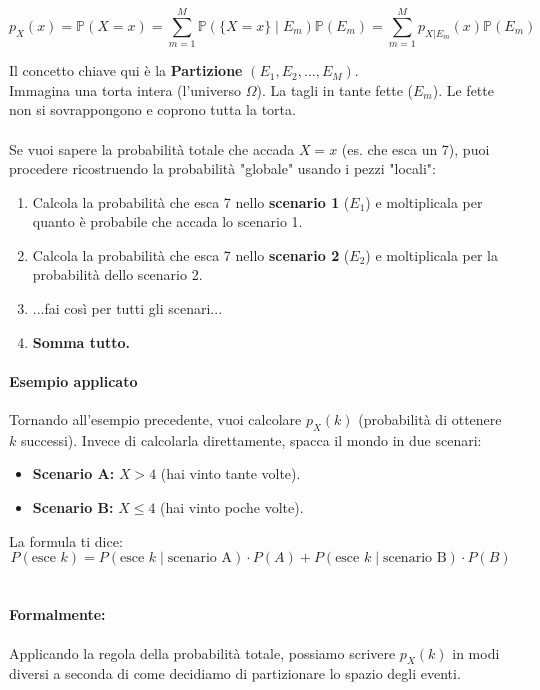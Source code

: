 \begin{equation}
\boxed{p_X(x) = \mathbb{P}(X = x) = \sum_{m=1}^M \mathbb{P}(\{X = x\} \mid E_m) \mathbb{P}(E_m) = \sum_{m=1}^M p_{X|E_m}(x)\mathbb{P}(E_m)}
\end{equation}

Il concetto chiave qui è la \textbf{Partizione} $(E_1, E_2, \dots, E_M)$.
\\Immagina una torta intera (l'universo $\Omega$). La tagli in tante fette ($E_m$). Le fette non si sovrappongono e coprono tutta la torta.
\\\\
Se vuoi sapere la probabilità totale che accada $X = x$ (es. che esca un 7), puoi procedere ricostruendo la probabilità "globale" usando i pezzi "locali":

\begin{enumerate}
    \item Calcola la probabilità che esca 7 nello \textbf{scenario 1} ($E_1$) e moltiplicala per quanto è probabile che accada lo scenario 1.
    \item Calcola la probabilità che esca 7 nello \textbf{scenario 2} ($E_2$) e moltiplicala per la probabilità dello scenario 2.
    \item ...fai così per tutti gli scenari...
    \item \textbf{Somma tutto.}
\end{enumerate}

\paragraph{Esempio applicato}
Tornando all'esempio precedente, vuoi calcolare $p_X(k)$ (probabilità di ottenere $k$ successi). Invece di calcolarla direttamente, spacca il mondo in due scenari:
\begin{itemize}
    \item \textbf{Scenario A:} $X > 4$ (hai vinto tante volte).
    \item \textbf{Scenario B:} $X \le 4$ (hai vinto poche volte).
\end{itemize}

La formula ti dice:
\[
P(\text{esce } k) = P(\text{esce } k \mid \text{scenario A}) \cdot P(A) + P(\text{esce } k \mid \text{scenario B}) \cdot P(B)
\]
\\
\paragraph{Formalmente:} Applicando la regola della probabilità totale, possiamo scrivere $p_X(k)$ in modi diversi a seconda di come decidiamo di partizionare lo spazio degli eventi.

